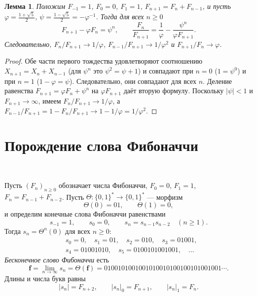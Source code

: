 \documentclass[a4paper,14pt]{extreport}
\theoremstyle{plain}
\newtheorem{lemma}{Лемма}[section]
\theoremstyle{definition}
\theoremstyle{remark}
\begin{document}
\begin{lemma}\label{lem:fibA}
	Положим $F_{-1}=1$, $F_0=0$, $F_1=1$, $F_{n+1}=F_n+F_{n-1}$, и пусть
	$\varphi=\frac{1+\sqrt5}{2}$, $\psi=\frac{1-\sqrt5}{2}=-\varphi^{-1}$.
	Тогда для всех $n\ge 0$
	\begin{equation}
		F_{n+1}-\varphi F_n=\psi^{n},\qquad
		\frac{F_n}{F_{n+1}}=\frac1\varphi-\frac{\psi^{n}}{\varphi F_{n+1}} .
	\end{equation}
	Следовательно, $F_n/F_{n+1}\to 1/\varphi$, $F_{n-1}/F_{n+1}\to 1/\varphi^{2}$ и
	$F_{n+1}/F_n\to\varphi$.
\end{lemma}
\begin{proof}
	Обе части первого тождества удовлетворяют соотношению $X_{n+1}=X_n+X_{n-1}$ (для $\psi^n$ это $\psi^2=\psi+1$)
	и совпадают при $n=0$ ($1=\psi^0$) и при $n=1$ ($1-\varphi=\psi$). Следовательно, они совпадают для всех $n$.
	Деление равенства $F_{n+1}=\varphi F_n+\psi^n$ на $\varphi F_{n+1}$ даёт вторую формулу.
	Поскольку $|\psi|<1$ и $F_{n+1}\to\infty$, имеем $F_n/F_{n+1}\to1/\varphi$, а
	$F_{n-1}/F_{n+1}=1-F_n/F_{n+1}\to 1-1/\varphi=1/\varphi^{2}$.
\end{proof}
\section{Порождение слова Фибоначчи}~\label{sec3.2}

Пусть $(F_n)_{n\ge0}$ обозначает числа Фибоначчи, $F_0=0$, $F_1=1$, $F_{n}=F_{n-1}+F_{n-2}$.
Пусть $\Theta\colon\{0,1\}^*\to\{0,1\}^*$ --- морфизм
\begin{equation}
	\Theta(0)=01,\qquad \Theta(1)=0 ,
\end{equation}
и определим конечные слова Фибоначчи равенствами
\begin{equation}
	s_{-1}=1,\qquad s_0=0,\qquad s_n=s_{n-1}s_{n-2}\quad(n\ge1).
\end{equation}
Тогда $s_n=\Theta^n(0)$ для всех $n\ge0$:
\begin{equation}
	\begin{aligned}
 &s_0=0,\quad s_1=01,\quad s_2=010,\quad s_3=01001,\\
 &s_4=01001010,\quad s_5=0100101001001,\quad\dots
\end{aligned}
\end{equation}
\emph{Бесконечное слово Фибоначчи} есть
\begin{equation}\label{re.1}
	\mathbf{f}=\lim_{n\to\infty}s_n=\Theta(\mathbf f)
	=0100101001001010010100100101001001\cdots .
\end{equation}
Длины и числа букв равны
\begin{equation}
	|s_n|=F_{n+2},\qquad |s_n|_0=F_{n+1},\qquad |s_n|_1=F_n .
\end{equation}
\end{document}

